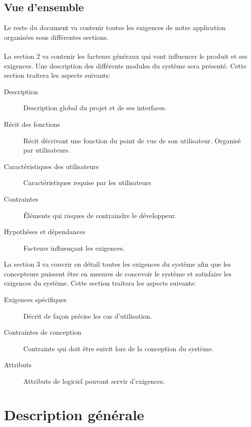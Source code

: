 \documentclass{scrreprt}
\begin{document}
\section{Vue d'ensemble}
Le  reste du document va contenir toutes les exigences de notre application organisées sous différentes sections.
\\
\\
La section 2 va contenir les facteurs généraux qui vont influencer le produit et ses exigences. Une description des différents modules du système sera présenté. Cette section traitera les aspects suivants:
\begin{description}
\item[Description] Description global du projet et de ses interfaces.
\item[Récit des fonctions] Récit décrivant une fonction du point de vue de son utilisateur. Organisé par utilisateurs.
\item[Caractéristiques des utilisateurs] Caractéristiques requise par les utilisateurs
\item[Contraintes] Éléments qui risques de contraindre le développeur.
\item[Hypothèses et dépendances] Facteurs influençant les exigences.
\end{description}

La section 3 va couvrir en détail toutes les exigences du système afin que les concepteurs puissent être en mesures de concevoir le système et satisfaire les exigences du système. Cette section traitera les aspects suivants:

\begin{description}
\item[Exigences spécifiques] Décrit de façon précise les cas d'utilisation.
\item[Contraintes de conception] Contrainte qui doit être suivit lors de la conception du système.
\item[Attributs] Attributs de logiciel pouvant servir d'exigences. 
\end{description}
\chapter{Description générale}
\end{document}
